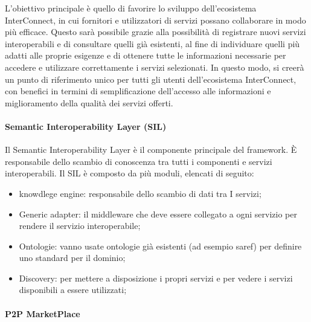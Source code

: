 L'obiettivo principale è quello di favorire lo sviluppo dell'ecosistema InterConnect, in cui fornitori e utilizzatori di servizi possano collaborare in modo più efficace. Questo sarà possibile grazie alla possibilità di registrare nuovi servizi interoperabili e di consultare quelli già esistenti, al fine di individuare quelli più adatti alle proprie esigenze e di ottenere tutte le informazioni necessarie per accedere e utilizzare correttamente i servizi selezionati. In questo modo, si creerà un punto di riferimento unico per tutti gli utenti dell'ecosistema InterConnect, con benefici in termini di semplificazione dell'accesso alle informazioni e miglioramento della qualità dei servizi offerti.


\paragraph{Semantic Interoperability Layer (SIL)}
Il Semantic Interoperability Layer è il componente principale del framework. È responsabile dello scambio di conoscenza tra tutti i componenti e servizi interoperabili.
Il SIL è composto da più moduli, elencati di seguito:
\begin{itemize}
    \item knowdlege engine: responsabile dello scambio di dati tra I servizi;
    \item Generic adapter: il middleware che deve essere collegato a ogni servizio per rendere il servizio interoperabile;
    \item Ontologie: vanno usate ontologie già esistenti (ad esempio saref) per definire uno standard per il dominio;
    \item Discovery: per mettere a disposizione i propri servizi e per vedere i servizi disponibili a essere utilizzati;
\end{itemize}


\paragraph{P2P MarketPlace}

